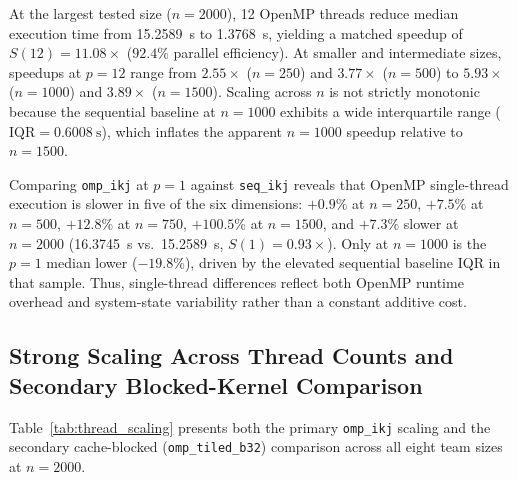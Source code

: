\documentclass[11pt,a4paper]{article}
\begin{document}
At the largest tested size ($n=2000$), 12 OpenMP threads reduce median execution time from \SI{15.2589}{\second} to \SI{1.3768}{\second}, yielding a matched speedup of $S(12) = 11.08\times$ ($92.4\%$ parallel efficiency). At smaller and intermediate sizes, speedups at $p=12$ range from $2.55\times$ ($n=250$) and $3.77\times$ ($n=500$) to $5.93\times$ ($n=1000$) and $3.89\times$ ($n=1500$). Scaling across $n$ is not strictly monotonic because the sequential baseline at $n=1000$ exhibits a wide interquartile range ($\text{IQR} = \SI{0.6008}{\second}$), which inflates the apparent $n=1000$ speedup relative to $n=1500$.

Comparing \texttt{omp\_ikj} at $p=1$ against \texttt{seq\_ikj} reveals that OpenMP single-thread execution is slower in five of the six dimensions: $+0.9\%$ at $n=250$, $+7.5\%$ at $n=500$, $+12.8\%$ at $n=750$, $+100.5\%$ at $n=1500$, and $+7.3\%$ slower at $n=2000$ (\SI{16.3745}{\second} vs.\ \SI{15.2589}{\second}, $S(1)=0.93\times$). Only at $n=1000$ is the $p=1$ median lower ($-19.8\%$), driven by the elevated sequential baseline IQR in that sample. Thus, single-thread differences reflect both OpenMP runtime overhead and system-state variability rather than a constant additive cost.

\subsection{Strong Scaling Across Thread Counts and Secondary Blocked-Kernel Comparison}
Table~\ref{tab:thread_scaling} presents both the primary \texttt{omp\_ikj} scaling and the secondary cache-blocked (\texttt{omp\_tiled\_b32}) comparison across all eight team sizes at $n=2000$.
\end{document}
